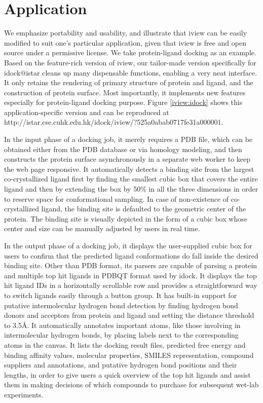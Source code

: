\section{Application}

We emphasize portability and usability, and illustrate that iview can be easily modified to suit one's particular application, given that iview is free and open source under a permissive license. We take protein-ligand docking as an example. Based on the feature-rich version of iview, our tailor-made version specifically for idock@istar cleans up many dispensable functions, enabling a very neat interface. It only retains the rendering of primary structure of protein and ligand, and the construction of protein surface. Most importantly, it implements new features especially for protein-ligand docking purpose. Figure \ref{iview:idock} shows this application-specific version and can be reproduced at http://istar.cse.cuhk.edu.hk/idock/iview/?525a0abab0717fe31a000001.

In the input phase of a docking job, it merely requires a PDB file, which can be obtained either from the PDB database \citep{1357} or via homology modeling, and then constructs the protein surface asynchronously in a separate web worker to keep the web page responsive. It automatically detects a binding site from the largest co-crystallized ligand first by finding the smallest cubic box that covers the entire ligand and then by extending the box by 50\% in all the three dimensions in order to reserve space for conformational sampling. In case of non-existence of co-crystallized ligand, the binding site is defaulted to the geometric center of the protein. The binding site is visually depicted in the form of a cubic box whose center and size can be manually adjusted by users in real time.

In the output phase of a docking job, it displays the user-supplied cubic box for users to confirm that the predicted ligand conformations do fall inside the desired binding site. Other than PDB format, its parsers are capable of parsing a protein and multiple top hit ligands in PDBQT format used by idock. It displays the top hit ligand IDs in a horizontally scrollable row and provides a straightforward way to switch ligands easily through a button group. It has built-in support for putative intermolecular hydrogen bond detection by finding hydrogen bond donors and acceptors from protein and ligand and setting the distance threshold to 3.5\AA. It automatically annotates important atoms, like those involving in intermolecular hydrogen bonds, by placing labels next to the corresponding atoms in the canvas. It lists the docking result files, predicted free energy and binding affinity values, molecular properties, SMILES representation, compound suppliers and annotations, and putative hydrogen bond positions and their lengths, in order to give users a quick overview of the top hit ligands and assist them in making decisions of which compounds to purchase for subsequent wet-lab experiments.

